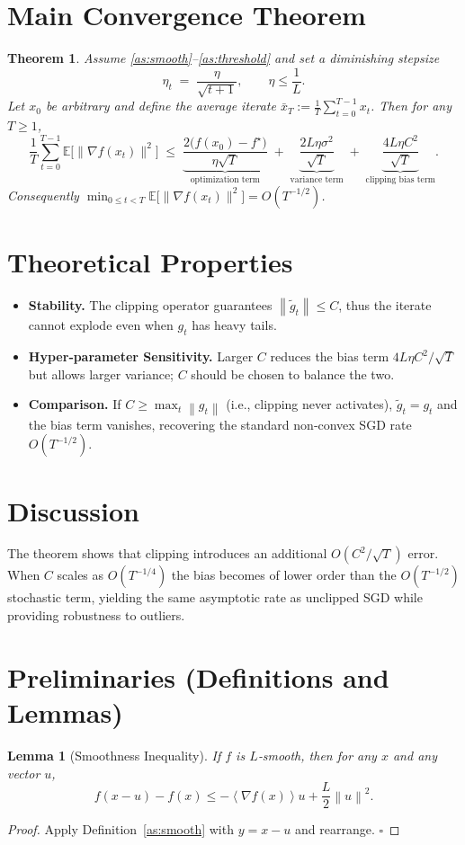 \documentclass{article}
\newtheorem{theorem}{Theorem}
\newtheorem{lemma}{Lemma}
\newcommand{\E}{\mathbb{E}}
\newcommand{\norm}[1]{\left\lVert #1\right\rVert}
\newcommand{\inner}[1]{\left\langle #1\right\rangle}
\begin{document}
\section*{Main Convergence Theorem}
\begin{theorem}\label{thm:main}
Assume \ref{as:smooth}–\ref{as:threshold} and set a diminishing stepsize
\[
\eta_t \;=\; \frac{\eta}{\sqrt{t+1}},\qquad \eta\le \frac{1}{L}.
\]
Let $x_0$ be arbitrary and define the average iterate $\bar x_T:=\frac1T\sum_{t=0}^{T-1}x_t$.
Then for any $T\ge1$,
\[
\frac{1}{T}\sum_{t=0}^{T-1}\E\!\bigl[\|\nabla f(x_t)\|^2\bigr]
\;\le\;
\underbrace{\frac{2\bigl(f(x_0)-f^\star\bigr)}{\eta\sqrt{T}}}_{\text{optimization term}}
\;+\;
\underbrace{\frac{2L\eta\sigma^2}{\sqrt{T}}}_{\text{variance term}}
\;+\;
\underbrace{\frac{4L\eta C^2}{\sqrt{T}}}_{\text{clipping bias term}} .
\tag{2}
\]
Consequently $\displaystyle\min_{0\le t<T}\E\!\bigl[\|\nabla f(x_t)\|^2\bigr]=O(T^{-1/2})$.
\end{theorem}

\section*{Theoretical Properties}
\begin{itemize}
    \item \textbf{Stability.} The clipping operator guarantees $\norm{\tilde g_t}\le C$, thus the iterate cannot explode even when $g_t$ has heavy tails.
    \item \textbf{Hyper‑parameter Sensitivity.} Larger $C$ reduces the bias term $4L\eta C^2/\sqrt{T}$ but allows larger variance; $C$ should be chosen to balance the two.
    \item \textbf{Comparison.} If $C\ge \max_t \norm{g_t}$ (i.e., clipping never activates), $\tilde g_t=g_t$ and the bias term vanishes, recovering the standard non‑convex SGD rate $O(T^{-1/2})$.
\end{itemize}

\section*{Discussion}
The theorem shows that clipping introduces an additional $O(C^2/\sqrt{T})$ error. When $C$ scales as $O(T^{-1/4})$ the bias becomes of lower order than the $O(T^{-1/2})$ stochastic term, yielding the same asymptotic rate as unclipped SGD while providing robustness to outliers.

\newpage

\section*{Preliminaries (Definitions and Lemmas)}
\begin{lemma}[Smoothness Inequality]\label{lem:smooth}
If $f$ is $L$‑smooth, then for any $x$ and any vector $u$,
\[
f(x-u)-f(x) \le -\inner{\nabla f(x)}{u}+\frac{L}{2}\norm{u}^2 .
\]
\end{lemma}
\begin{proof}
Apply Definition~\ref{as:smooth} with $y=x-u$ and rearrange. \hfill $\square$
\end{proof}
\end{document}
